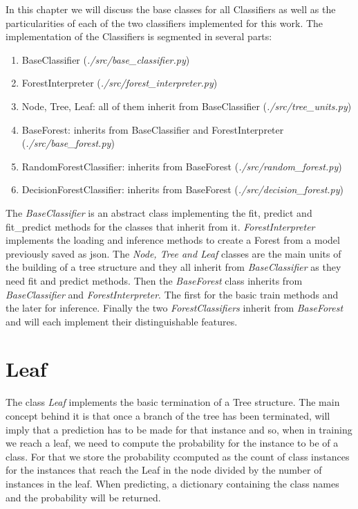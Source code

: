 In this chapter we will discuss the base classes for all Classifiers as well as the particularities of each of the two classifiers implemented for this work. The implementation of the Classifiers is segmented in several parts:

\begin{enumerate}
    \item BaseClassifier (\textit{./src/base\_classifier.py})
    \item ForestInterpreter (\textit{./src/forest\_interpreter.py})
    \item Node, Tree, Leaf: all of them inherit from BaseClassifier (\textit{./src/tree\_units.py})
    \item BaseForest: inherits from BaseClassifier and ForestInterpreter (\textit{./src/base\_forest.py})
    \item RandomForestClassifier: inherits from BaseForest (\textit{./src/random\_forest.py})
    \item DecisionForestClassifier: inherits from BaseForest (\textit{./src/decision\_forest.py})
\end{enumerate}

The \textit{BaseClassifier} is an abstract class implementing the fit, predict and fit\_predict methods for the classes that inherit from it. \textit{ForestInterpreter} implements the loading and inference methods to create a Forest from a model previously saved as json. The \textit{Node, Tree and Leaf} classes are the main units of the building of a tree structure and they all inherit from \textit{BaseClassifier} as they need fit and predict methods. Then the \textit{BaseForest} class inherits from \textit{BaseClassifier} and \textit{ForestInterpreter}. The first for the basic train methods and the later for inference. Finally the two \textit{ForestClassifiers} inherit from \textit{BaseForest} and will each implement their distinguishable features.


\section{Leaf}

The class \textit{Leaf} implements the basic termination of a Tree structure. The main concept behind it is that once a branch of the tree has been terminated, will imply that a prediction has to be made for that instance and so, when in training we reach a leaf, we need to compute the probability for the instance to be of a class. For that we store the probability ccomputed as the count of class instances for the instances that reach the Leaf in the node divided by the number of instances in the leaf. When predicting, a dictionary containing the class names and the probability will be returned.


